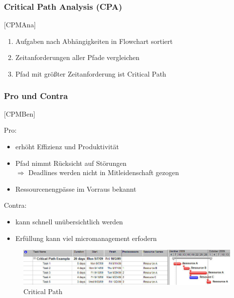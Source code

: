\documentclass[%
	handout
]{beamer}
\newcommand{\cpa}{[CPMAna]}
\newcommand{\cpb}{[CPMBen]}
\begin{document}
		\begin{frame}
			\frametitle{Critical Path Analysis (CPA)} \cpa
			\begin{enumerate}
				\item Aufgaben nach Abhängigkeiten in Flowchart sortiert\pause
				\item Zeitanforderungen aller Pfade vergleichen\pause
				\item Pfad mit größter Zeitanforderung ist Critical Path
			\end{enumerate}
		\end{frame}
		
		\begin{frame}
			\frametitle{Pro und Contra}
			\cpb\\
			\begin{minipage}[t]{.48\textwidth}
				Pro:
				\begin{itemize}
					\item erhöht Effizienz und Produktivität
					\item Pfad nimmt Rücksicht auf Störungen\\
						$\Longrightarrow$ Deadlines werden nicht in Mitleidenschaft gezogen
					\item Ressourcenengpässe im Vorraus bekannt
				\end{itemize}
			\end{minipage}
			\begin{minipage}[t]{.48\textwidth}
				Contra:
				\begin{itemize}
					\item kann schnell unübersichtlich werden
					\item Erfüllung kann viel micromanagement erfodern
				\end{itemize}
			\end{minipage}
		\end{frame}
		
		\begin{frame}
			\begin{figure}
				\begin{center}
					\includegraphics[scale=.5]{../images/critical-path.jpg}
					\caption{Critical Path}
					\label{img:crit}
				\end{center}
			\end{figure}
		\end{frame}
		
\end{document}
